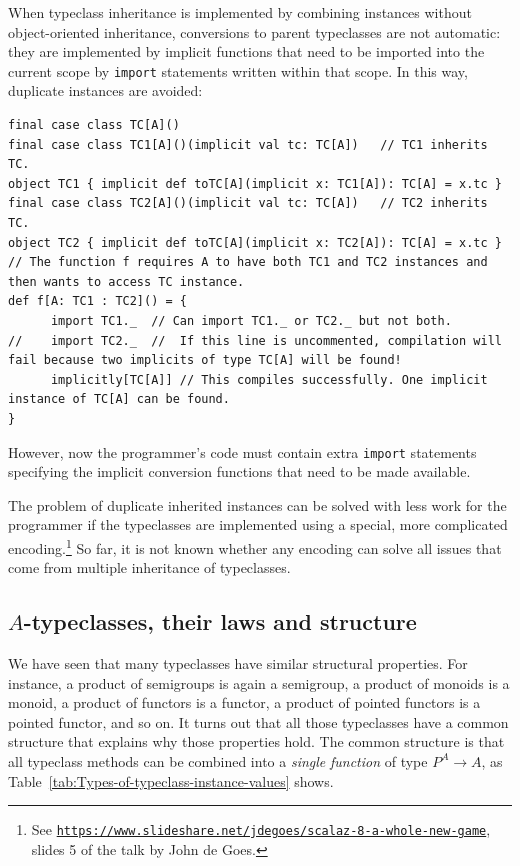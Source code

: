 When typeclass inheritance is implemented by combining instances without
object-oriented inheritance, conversions to parent typeclasses are
not automatic: they are implemented by implicit functions that need
to be imported into the current scope by \lstinline!import! statements
written within that scope. In this way, duplicate instances are avoided:
\begin{lstlisting}
final case class TC[A]()
final case class TC1[A]()(implicit val tc: TC[A])   // TC1 inherits TC.
object TC1 { implicit def toTC[A](implicit x: TC1[A]): TC[A] = x.tc }
final case class TC2[A]()(implicit val tc: TC[A])   // TC2 inherits TC.
object TC2 { implicit def toTC[A](implicit x: TC2[A]): TC[A] = x.tc }
// The function f requires A to have both TC1 and TC2 instances and then wants to access TC instance.
def f[A: TC1 : TC2]() = {
      import TC1._  // Can import TC1._ or TC2._ but not both.
//    import TC2._  //  If this line is uncommented, compilation will fail because two implicits of type TC[A] will be found!
      implicitly[TC[A]] // This compiles successfully. One implicit instance of TC[A] can be found.
}
\end{lstlisting}
However, now the programmer\textsf{'}s code must contain extra \lstinline!import!
statements specifying the implicit conversion functions that need
to be made available.

The problem of duplicate inherited instances can be solved with less
work for the programmer if the typeclasses are implemented using a
special, more complicated encoding.\footnote{See \texttt{\href{https://www.slideshare.net/jdegoes/scalaz-8-a-whole-new-game}{https://www.slideshare.net/jdegoes/scalaz-8-a-whole-new-game}},
slides 5 of the talk by John de
Goes.} So far, it is not known whether any encoding can solve all issues
that come from multiple inheritance of typeclasses.

\subsection{$A$-typeclasses, their laws and structure\label{subsec:A-typeclasses}}

We have seen that many typeclasses have similar structural properties.
For instance, a product of semigroups is again a semigroup, a product
of monoids is a monoid, a product of functors is a functor, a product
of pointed functors is a pointed functor, and so on. It turns out
that all those typeclasses have a common structure that explains why
those properties hold. The common structure is that all typeclass
methods can be combined into a \emph{single} \emph{function} of type
$P^{A}\rightarrow A$, as Table~\ref{tab:Types-of-typeclass-instance-values}
shows.

